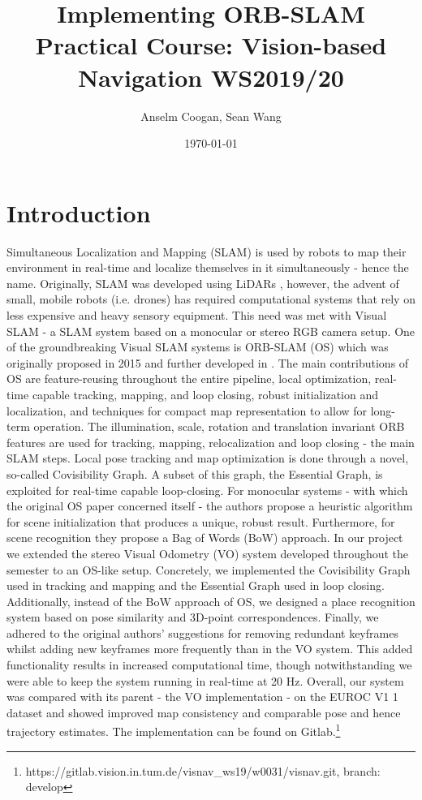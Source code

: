 \documentclass[a4paper, 10pt]{article}
\author{Anselm Coogan, Sean Wang}
\date{\today}
\title{Implementing ORB-SLAM\\\medskip
\large Practical Course: Vision-based Navigation WS2019/20}
\begin{document}
\maketitle

\section{Introduction}
\label{sec:org1a80a53}
Simultaneous Localization and Mapping (SLAM) is used by robots to map their environment in real-time and localize themselves in it simultaneously - hence the name.
Originally, SLAM was developed using LiDARs \cite{slam}, however, the advent of small, mobile robots (i.e. drones) has required computational systems that rely on less expensive and heavy sensory equipment. 
This need was met with Visual SLAM - a SLAM system based on a monocular or stereo RGB camera setup.
One of the groundbreaking Visual SLAM systems is ORB-SLAM (OS) which was originally proposed in 2015 \cite{os} and further developed in \cite{os-II}.
The main contributions of OS are feature-reusing throughout the entire pipeline, local optimization, real-time capable tracking, mapping, and loop closing, robust initialization and localization, and techniques for compact map representation to allow for long-term operation. 
The illumination, scale, rotation and translation invariant ORB features\cite{orb} are used for tracking, mapping, relocalization and loop closing - the main SLAM steps. 
Local pose tracking and map optimization is done through a novel, so-called Covisibility Graph. A subset of this graph, the Essential Graph, is exploited for real-time capable loop-closing. 
For monocular systems - with which the original OS paper concerned itself - the authors propose a heuristic algorithm for scene initialization that produces a unique, robust result. 
Furthermore, for scene recognition they propose a Bag of Words (BoW) \cite{bow} approach.
In our project we extended the stereo Visual Odometry (VO) system developed throughout the semester to an OS-like setup. 
Concretely, we implemented the Covisibility Graph used in tracking and mapping and the Essential Graph used in loop closing. 
Additionally, instead of the BoW approach of OS, we designed a place recognition system based on pose similarity and 3D-point correspondences. 
Finally, we adhered to the original authors’ suggestions for removing redundant keyframes whilst adding new keyframes more frequently than in the VO system. 
This added functionality results in increased computational time, though notwithstanding we were able to keep the system running in real-time at 20 Hz. 
Overall, our system was compared with its parent - the VO implementation - on the EUROC V1 1 dataset \cite{euroc} and showed improved map consistency and comparable pose and hence trajectory estimates. 
The implementation can be found on Gitlab.\footnote{https://gitlab.vision.in.tum.de/visnav\_ws19/w0031/visnav.git, branch: develop}
\end{document}
